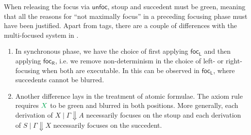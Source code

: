 \documentclass[runningheads]{llncs}
\newcommand{\tr}{\otimes \mathsf{R}}
\newcommand{\lleft}{{\multimap}\mathsf{L}}
\newcommand{\pass}{\mathsf{pass}}
\newcommand{\unitl}{\mathsf{IL}}
\newcommand{\unitr}{\mathsf{IR}}
\newcommand{\otR}{\tr}
\newcommand{\lolliL}{\lleft}
\newcommand{\IL}{\unitl}
\newcommand{\IR}{\unitr}
\newcommand{\ax}{\mathsf{ax}}
\newcommand{\red}[1]{{\color{Red}#1}}
\newcommand{\green}[1]{{\color{Green}#1}}
\newcommand{\up}{\Uparrow}
\newcommand{\dn}{\Downarrow}
\newcommand{\focL}{\mathsf{foc_L}}
\newcommand{\focR}{\mathsf{foc_R}}
\newcommand{\blurL}{\mathsf{blur_L}}
\newcommand{\unfoc}{\mathsf{unfoc}}
\begin{document}
When releasing the focus via $\unfoc$, stoup and succedent must be green, meaning that all the reasons for ``not maximally focus'' in a preceding focusing phase must have been justified. Apart from tags, there are a couple of differences with the multi-focused system in .
\begin{enumerate}
  \item In synchronous phase, we have the choice of first applying $\focL$ and then applying $\focR$, i.e. we remove non-determinism in the choice of left- or right-focusing when both are executable. In  this can be observed in $\focL$, where succedents cannot be blurred. %
\item Another difference lays in the treatment of atomic formulae. The axiom rule requires $\green{X}$ to be green and blurred in both positions. More generally, %
each derivation of $X \mid \Gamma \dn A$ necessarily focuses on the stoup and each derivation of $S \mid \Gamma \dn X$ necessarily focuses on the succedent.
\end{enumerate}
\end{document}
